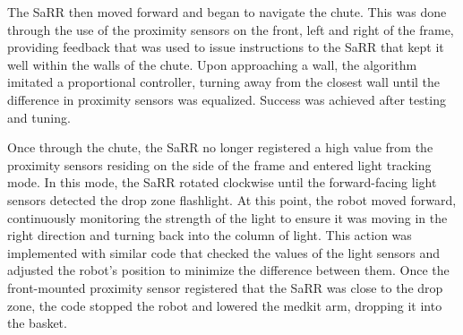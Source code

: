 The SaRR then moved forward and began to navigate the chute. This was done through the use of the proximity sensors on the front, left and right of the frame, providing feedback that was used to issue instructions to the SaRR that kept it well within the walls of the chute. Upon approaching a wall, the algorithm imitated a proportional controller, turning away from the closest wall until the difference in proximity sensors was equalized. Success was achieved after testing and tuning.

Once through the chute, the SaRR no longer registered a high value from the proximity sensors residing on the side of the frame and entered light tracking mode. In this mode, the SaRR rotated clockwise until the forward-facing light sensors detected the drop zone flashlight. At this point, the robot moved forward, continuously monitoring the strength of the light to ensure it was moving in the right direction and turning back into the column of light. This action was implemented with similar code that checked the values of the light sensors and adjusted the robot's position to minimize the difference between them. Once the front-mounted proximity sensor registered that the SaRR was close to the drop zone, the code stopped the robot and lowered the medkit arm, dropping it into the basket.